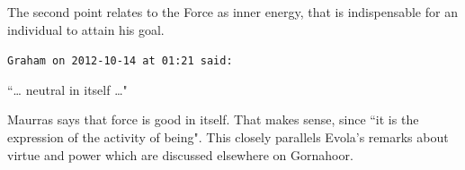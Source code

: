 \begin{footnotesize}
\begin{sffamily}
The second point relates to the Force as inner energy, that is indispensable for an individual to attain his goal.


\hfill

\texttt{Graham on 2012-10-14 at 01:21 said: }

``… neutral in itself …"

Maurras says that force is good in itself. That makes sense, since ``it is the expression of the activity of being". This closely parallels Evola's remarks about virtue and power which are discussed elsewhere on Gornahoor.


\end{sffamily}\end{footnotesize}
